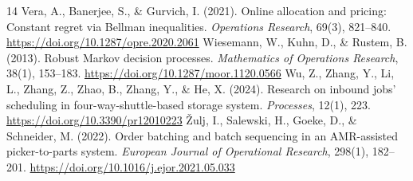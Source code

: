\documentclass[11pt, a4paper]{article}
\begin{document}
\begin{thebibliography}{14}
   Vera, A., Banerjee, S., \& Gurvich, I. (2021). Online allocation and pricing: Constant regret via Bellman inequalities. \emph{Operations Research}, 69(3), 821--840. \url{https://doi.org/10.1287/opre.2020.2061}
   Wiesemann, W., Kuhn, D., \& Rustem, B. (2013). Robust Markov decision processes. \emph{Mathematics of Operations Research}, 38(1), 153--183. \url{https://doi.org/10.1287/moor.1120.0566}
   Wu, Z., Zhang, Y., Li, L., Zhang, Z., Zhao, B., Zhang, Y., \& He, X. (2024). Research on inbound jobs' scheduling in four-way-shuttle-based storage system. \emph{Processes}, 12(1), 223. \url{https://doi.org/10.3390/pr12010223}
   \v{Z}ulj, I., Salewski, H., Goeke, D., \& Schneider, M. (2022). Order batching and batch sequencing in an AMR-assisted picker-to-parts system. \emph{European Journal of Operational Research}, 298(1), 182--201. \url{https://doi.org/10.1016/j.ejor.2021.05.033}
\end{thebibliography}
\end{document}
